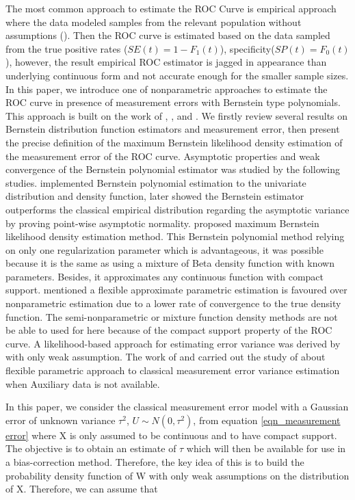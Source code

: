 The most common approach to estimate the ROC Curve is empirical approach where the data modeled samples from the relevant population without assumptions (\cite{krzanowski2009roc}). Then the ROC curve is estimated based on the data sampled from the true positive rates ($SE(t) = 1-F_1(t)$), specificity($SP(t) = F_0(t)$), however, the result empirical ROC estimator is jagged in appearance than underlying continuous form and not accurate enough for the smaller sample sizes. In this paper, we introduce one of nonparametric approaches to estimate the ROC curve in presence of measurement errors with Bernstein type polynomials. This approach is built on the work of \cite{schwarz2010consistent}, \cite{bertrand2019flexible}, and \cite{guan2016efficient}. We firstly review several results on Bernstein distribution function estimators and measurement error, then present the precise definition of the maximum Bernstein likelihood density estimation of the measurement error of the ROC curve. Asymptotic properties and weak convergence of the Bernstein polynomial estimator was studied by the following studies.\cite{babu2002application} implemented Bernstein polynomial estimation to the univariate distribution and density function, later \cite{leblanc2010bias} showed the Bernstein estimator outperforms the classical empirical distribution regarding the asymptotic variance by proving point-wise asymptotic normality. \cite{guan2016efficient} proposed maximum Bernstein likelihood density estimation method. This Bernstein polynomial method relying on only one regularization parameter which is advantageous, it was possible because it is the same as using a mixture of Beta density function with known parameters. Besides, it approximates any continuous function with compact support. \cite{guan2016efficient} mentioned a flexible approximate parametric estimation is favoured over nonparametric estimation due to a lower rate of convergence to the true density function. The semi-nonparametric or mixture function density methods are not be able to used for here because of the compact support property of the ROC curve. A likelihood-based approach for estimating error variance was derived by \cite{schwarz2010consistent} with only weak assumption. The work of \cite{guan2016efficient}
and \cite{schwarz2010consistent} carried out the study of \cite{bertrand2019flexible} about flexible parametric approach to classical measurement error variance estimation when Auxiliary data is not available.

In this paper, we consider the classical measurement error model with a Gaussian error of unknown variance $\tau^2$, $U\sim N(0, \tau^2)$, from equation \ref{eqn_measurement error} where X is only assumed to be continuous and to have compact support. The objective is to obtain an estimate of $\tau$ which will then be available for use in a bias-correction method. Therefore, the key idea of this is to build the probability density function of W with only weak assumptions on the distribution of X. Therefore, we can assume that


